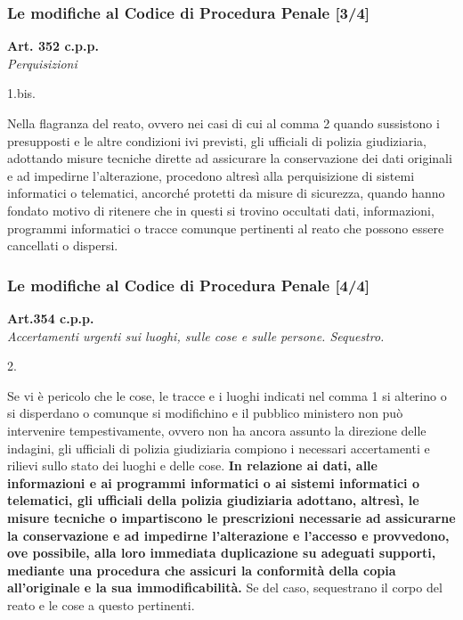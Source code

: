 \documentclass[11pt]{beamer}
\begin{document}
	\begin{frame}[shrink]
		\frametitle{Le modifiche al Codice di Procedura Penale [3/4]}
			\begin{center}
				\textbf{Art. 352 c.p.p.} \\\textit{Perquisizioni}
			\end{center}
			\begin{labeling}{1.bis.}
				\item[\textellipsis]
				\item[1-bis.] Nella flagranza del reato, ovvero nei casi di cui al comma 2 quando sussistono i presupposti e le altre condizioni ivi previsti, gli ufficiali di polizia giudiziaria, adottando misure tecniche dirette ad assicurare la conservazione dei dati originali e ad impedirne l'alterazione, procedono altresì alla perquisizione di sistemi informatici o telematici, ancorché protetti da misure di sicurezza, quando hanno fondato motivo di ritenere che in questi si trovino occultati dati, informazioni, programmi informatici o tracce comunque pertinenti al reato che possono essere cancellati o dispersi.
				\item[\textellipsis]
			\end{labeling}
	\end{frame}
	\begin{frame}[shrink]
		\frametitle{Le modifiche al Codice di Procedura Penale [4/4]}
			\begin{center}
				\textbf{Art.354 c.p.p.}\\\textit{Accertamenti urgenti sui luoghi, sulle cose e sulle persone. Sequestro.}
			\end{center}
			\begin{labeling}{2.}
				\fontsize{7pt}{\baselineskip}\selectfont
				\setcounter{enumi}{1}
				\item[2.] Se vi è pericolo che le cose, le tracce e i luoghi indicati nel comma 1 si alterino o si disperdano o comunque si modifichino e il pubblico ministero non può intervenire tempestivamente, ovvero non ha ancora assunto la direzione delle indagini, gli ufficiali di polizia giudiziaria compiono i necessari accertamenti e rilievi sullo stato dei luoghi e delle cose. \textbf{In relazione ai dati, alle informazioni e ai programmi informatici o ai sistemi informatici o telematici, gli ufficiali della polizia giudiziaria adottano, altresì, le misure tecniche o impartiscono le prescrizioni necessarie ad assicurarne la conservazione e ad impedirne l'alterazione e l'accesso e provvedono, ove possibile, alla loro immediata duplicazione su adeguati supporti, mediante una procedura che assicuri la conformità della copia all'originale e la sua immodificabilità.} Se del caso, sequestrano il corpo del reato e le cose a questo pertinenti.
			\end{labeling}
	\end{frame}
\end{document}
